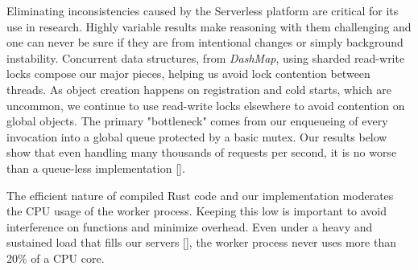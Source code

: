 Eliminating inconsistencies caused by the Serverless platform are critical for its use in research.
Highly variable results make reasoning with them challenging and one can never be sure if they are from intentional changes or simply background instability.
Concurrent data structures, from \emph{DashMap}, using sharded read-write locks compose our major pieces, helping us avoid lock contention between threads.
As object creation happens on registration and cold starts, which are uncommon, we continue to use read-write locks elsewhere to avoid contention on global objects.
The primary "bottleneck" comes from our enqueueing of every invocation into a global queue protected by a basic mutex.
Our results below show that even handling many thousands of requests per second, it is no worse than a queue-less implementation \ref{}.

The efficient nature of compiled Rust code and our implementation moderates the CPU usage of the worker process.
Keeping this low is important to avoid interference on functions and minimize overhead.
Even under a heavy and sustained load that fills our servers \ref{}, the \sysname{} worker process never uses more than 20\% of a CPU core.



